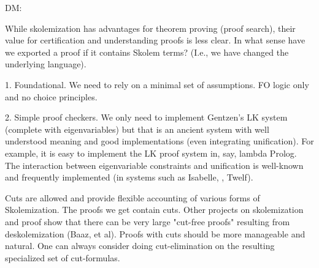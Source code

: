 {\color{red} DM: }
        
  While skolemization has advantages for theorem proving (proof
  search), their value for certification and understanding proofs is
  less clear.  In what sense have we exported a proof if it contains
  Skolem terms?  (I.e., we have changed the underlying language).

   1. Foundational.  We need to rely on a minimal set of assumptions.
      FO logic only and no choice principles.

   2. Simple proof checkers.  We only need to implement Gentzen's LK
      system (complete with eigenvariables) but that is an ancient
      system with well understood meaning and good implementations
      (even integrating unification).  For example, it is easy to
      implement the LK proof system in, say, lambda Prolog.  The
      interaction between eigenvariable constraints and unification is
      well-known \cite{miller92jsc} and frequently implemented (in
      systems such as Isabelle, \lP, Twelf).

Cuts are allowed and provide flexible accounting of various forms of
Skolemization.  The proofs we get contain cuts.  Other projects on
skolemization and proof show that there can be very large "cut-free
proofs" resulting from deskolemization (Baaz, et al).  Proofs with
cuts should be more manageable and natural.  One can always consider
doing cut-elimination on the resulting specialized set of
cut-formulas.
